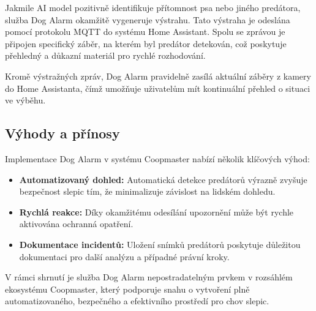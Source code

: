 Jakmile AI model pozitivně identifikuje přítomnost psa nebo jiného predátora, služba Dog Alarm okamžitě vygeneruje výstrahu.
Tato výstraha je odeslána pomocí protokolu MQTT do systému Home Assistant.
Spolu se zprávou je připojen specifický záběr, na kterém byl predátor detekován, což poskytuje přehledný a důkazní materiál pro rychlé rozhodování.

Kromě výstražných zpráv, Dog Alarm pravidelně zasílá aktuální záběry z kamery do Home Assistanta, čímž umožňuje uživatelům mít kontinuální přehled o situaci ve výběhu.

\subsection*{Výhody a přínosy}

Implementace Dog Alarm v systému Coopmaster nabízí několik klíčových výhod:
\begin{itemize}
    \item \textbf{Automatizovaný dohled:} Automatická detekce predátorů výrazně zvyšuje bezpečnost slepic tím, že minimalizuje závislost na lidském dohledu.
    \item \textbf{Rychlá reakce:} Díky okamžitému odesílání upozornění může být rychle aktivována ochranná opatření.
    \item \textbf{Dokumentace incidentů:} Uložení snímků predátorů poskytuje důležitou dokumentaci pro další analýzu a případné právní kroky.
\end{itemize}

V rámci shrnutí je služba Dog Alarm nepostradatelným prvkem v rozsáhlém ekosystému Coopmaster, který podporuje snahu o vytvoření plně automatizovaného, bezpečného a efektivního prostředí pro chov slepic.
